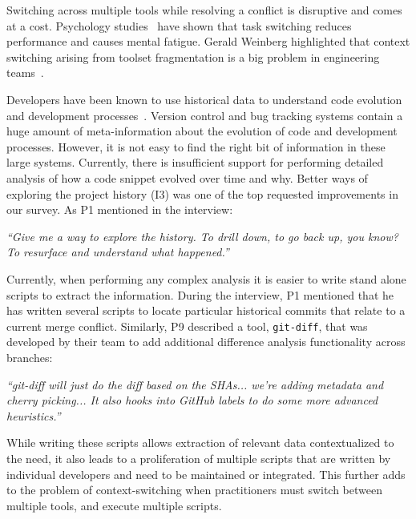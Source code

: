Switching across multiple tools while resolving a conflict is disruptive and comes at a cost. Psychology studies~\cite{Meiran2000}\cite{gopher2000switching} have shown that task switching reduces performance and causes mental fatigue. 
Gerald Weinberg highlighted that context switching arising from toolset fragmentation is a big problem in engineering teams~\cite{Weinberg1992}. 


Developers have been known to use historical data to understand code evolution and development processes~\cite{Mihai_lenses}.
Version control and bug tracking systems contain a huge amount of meta-information about the evolution of code and development processes.
However, it is not easy to find the right bit of information in these large systems. 
Currently, there is insufficient support for performing detailed analysis of how a code snippet evolved over time and why. 
Better ways of exploring the project history (I3) was one of the top requested improvements in our survey. 
As P1 mentioned in the interview:
\begin{displayquote}
\textit{``Give me a way to explore the history. To drill down, to go back up, you know? To resurface and understand what happened.''}
\end{displayquote}


Currently, when performing any complex analysis it is easier to write stand alone scripts to extract the information. 
During the interview, P1 mentioned that he has written several scripts to locate particular historical commits that relate to a current merge conflict. 
Similarly, P9 described a tool, \texttt{git-diff}, that was developed by their team to add additional difference analysis functionality across branches:
\begin{displayquote}
\textit{``git-diff will just do the diff based on the SHAs... we're adding metadata and cherry picking... It also hooks into GitHub labels to do some more advanced heuristics.''}
\end{displayquote}

While writing these scripts allows extraction of relevant data contextualized to the need, it also leads to a proliferation of multiple scripts that are written by individual developers and need to be maintained or integrated.
This further adds to the problem of context-switching when practitioners must switch between multiple tools, and execute multiple scripts.

